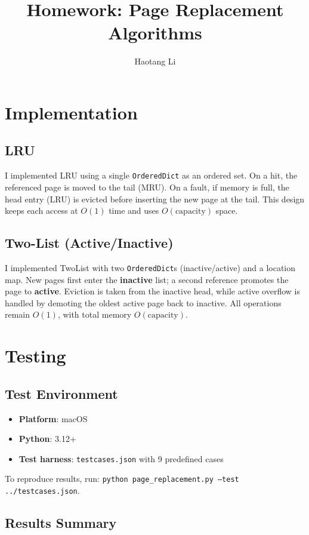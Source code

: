 \documentclass[11pt]{article}
\title{Homework: Page Replacement Algorithms}
\author{Haotang Li}
\date{}
\begin{document}
\maketitle

\section{Implementation}
\subsection{LRU}
I implemented LRU using a single \texttt{OrderedDict} as an ordered set.
On a hit, the referenced page is moved to the tail (MRU). On a fault, if memory is full,
the head entry (LRU) is evicted before inserting the new page at the tail.
This design keeps each access at \(O(1)\) time and uses \(O(\text{capacity})\) space.

\subsection{Two-List (Active/Inactive)}
I implemented TwoList with two \texttt{OrderedDict}s (inactive/active) and a location map.
New pages first enter the \textbf{inactive} list; a second reference promotes the page to
\textbf{active}. Eviction is taken from the inactive head, while active overflow is handled
by demoting the oldest active page back to inactive.
All operations remain \(O(1)\), with total memory \(O(\text{capacity})\).

\section{Testing}

\subsection{Test Environment}

\begin{itemize}
    \item \textbf{Platform}: macOS
    \item \textbf{Python}: 3.12+
    \item \textbf{Test harness}: \texttt{testcases.json} with 9 predefined cases
\end{itemize}

To reproduce results, run: \texttt{python page\_replacement.py --test ../testcases.json}.

\subsection{Results Summary}
\end{document}
